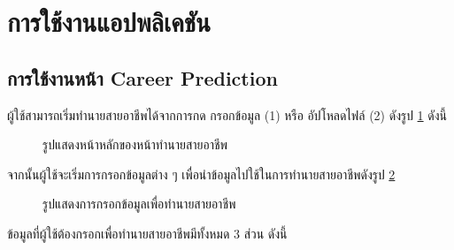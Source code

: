 \section{การใช้งานแอปพลิเคชัน}
\subsection{การใช้งานหน้า Career Prediction}
ผู้ใช้สามารถเริ่มทำนายสายอาชีพได้จากการกด กรอกข้อมูล (1) หรือ อัปโหลดไฟล์ (2) ดังรูป \ref{fig:start-CP} ดังนี้
\begin{figure}[H]\centering
    \caption{รูปแสดงหน้าหลักของหน้าทำนายสายอาชีพ}\label{fig:start-CP}
\end{figure}
จากนั้นผู้ใช้จะเริ่มการกรอกข้อมูลต่าง ๆ เพื่อนำข้อมูลไปใช้ในการทำนายสายอาชีพดังรูป \ref{fig:input-CP} 
\begin{figure}[H]\centering
    \caption{รูปแสดงการกรอกข้อมูลเพื่อทำนายสายอาชีพ}\label{fig:input-CP}
\end{figure}
ข้อมูลที่ผู้ใช้ต้องกรอกเพื่อทำนายสายอาชีพมีทั้งหมด 3 ส่วน ดังนี้

